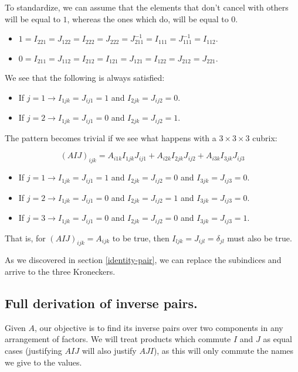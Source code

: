 To standardize, we can assume that the elements that don't cancel with others will be equal to $1$, whereas the ones which do, will be equal to $0$.

\begin{itemize}
	\item $1 = I_{221} = J_{122} = I_{222} = J_{222} = J_{211}^{-1} = I_{111} = J_{111}^{-1} = I_{112}$.
	\item $0 = I_{211} = J_{112} = I_{212} = I_{121} = J_{121} = I_{122} = J_{212} = J_{221}$.
\end{itemize}

We see that the following is always satisfied:

\begin{itemize}
	\item If $j = 1 \rightarrow I_{1jk} = J_{ij1} = 1$ and $I_{2jk} = J_{ij2} = 0$.
	\item If $j = 2 \rightarrow I_{1jk} = J_{ij1} = 0$ and $I_{2jk} = J_{ij2} = 1$.
\end{itemize}

The pattern becomes trivial if we see what happens with a $3 \times 3 \times 3$ cubrix:

$$(AIJ)_{ijk} = A_{i1k} I_{1jk} J_{ij1} + A_{i2k} I_{2jk} J_{ij2} + A_{i3k} I_{3jk} J_{ij3}$$

\begin{itemize}
	\item If $j = 1 \rightarrow I_{1jk} = J_{ij1} = 1$ and $I_{2jk} = J_{ij2} = 0$ and $I_{3jk} = J_{ij3} = 0$.
	\item If $j = 2 \rightarrow I_{1jk} = J_{ij1} = 0$ and $I_{2jk} = J_{ij2} = 1$ and $I_{3jk} = J_{ij3} = 0$.
	\item If $j = 3 \rightarrow I_{1jk} = J_{ij1} = 0$ and $I_{2jk} = J_{ij2} = 0$ and $I_{3jk} = J_{ij3} = 1$.
\end{itemize}

That is, for $(AIJ)_{ijk} = A_{ijk}$ to be true, then $I_{ljk} = J_{ijl} = \delta_{jl}$ must also be true.

As we discovered in section \ref{identity-pair}, we can replace the subindices and arrive to the three Kroneckers.

\subsection{Full derivation of inverse pairs.} \label{appendix-3}

Given $A$, our objective is to find its inverse pairs over two components in any arrangement of factors. We will treat products which commute $I$ and $J$ as equal cases (justifying $AIJ$ will also justify $AJI$), as this will only commute the names we give to the values.


